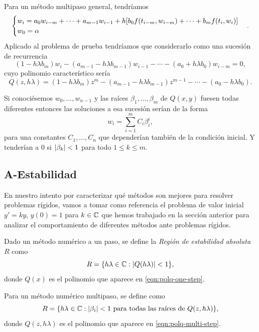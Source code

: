 Para un método multipaso general, tendríamos
\begin{equation*}
    \begin{cases}
        w_i =
        a_0w_{i-m} + \cdots + a_{m-1}w_{i-1} + h\qty[
            b_0f(t_{i-m}, w_{i-m}) + \cdots + b_mf(t_i, w_i)
        ] \\
        w_0 = \alpha
    \end{cases}.
\end{equation*}
Aplicado al problema de prueba tendríamos que considerarlo como
una sucesión de recurrencia
\begin{equation*}
    (1 - h\lambda b_m)w_i
    - (a_{m-1} - h\lambda b_{m-1})w_{i-1}
    - \cdots
    - (a_0 + h\lambda b_0)w_{i-m} = 0,
\end{equation*}
cuyo polinomio característico sería
\begin{equation}\label{eqn:polq-multi-step}
    Q(z, h\lambda) =
    (1 - h\lambda b_m)z^m
    - (a_{m-1} - h\lambda b_{m-1})z^{m-1}
    - \cdots
    - (a_0 - h\lambda b_0).
\end{equation}

Si conociésemos $w_0,\ldots,w_{n-1}$
y las raíces $\beta_1,\ldots,\beta_m$ de $Q(x, y)$ fuesen todas diferentes
entonces las soluciones a esa sucesión serían de la forma
\begin{equation*}
    w_i = \sum_{i=1}^m C_i\beta_i^i,
\end{equation*}
para una constantes $C_1,\ldots,C_n$
que dependerían también de la condición inicial.
Y tenderían a $0$ si $\abs{\beta_k} < 1$ para todo $1 \le k \le m$.

\subsection{A-Estabilidad}

En nuestro intento por caracterizar
qué métodos son mejores para resolver problemas rígidos,
vamos a tomar como referencia el problema de valor inicial
$y' = ky$, $y(0) = 1$ para $k \in \mathbb{C}$
que hemos trabajado en la sección anterior
para analizar el comportamiento de diferentes métodos
ante problemas rígidos.

\begin{definition}
    Dado un método numérico a un paso, se define
    la \emph{Región de estabilidad absoluta} $R$
    como
    \begin{equation*}
        R = \qty{h\lambda \in \mathbb{C}: \abs{Q(h\lambda)} < 1},
    \end{equation*}
    donde $Q(x)$ es el polinomio que aparece en \eqref{eqn:polq-one-step}.

    Para un método numérico multipaso, se define como
    \begin{equation*}
        R = \qty{h\lambda \in \mathbb{C}:
        \text{$\abs{\beta_i} < 1$ para todas las raíces de $Q(z, h\lambda)$}},
    \end{equation*}
    donde $Q(z, h\lambda)$ es el polinomio que aparece en
    \eqref{eqn:polq-multi-step}.
\end{definition}

